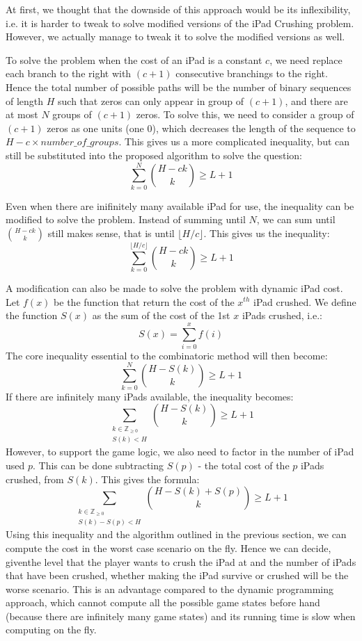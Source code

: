 \documentclass[12pt,a4paper,oneside]{report}
\begin{document}
At first, we thought that the downside of this approach would be its inflexibility, i.e. it is harder to tweak to solve modified versions of the iPad Crushing problem. However, we actually manage to tweak it to solve the modified versions as well.

To solve the problem when the cost of an iPad is a constant $c$, we need replace each branch to the right with $(c+1)$ consecutive branchings to the right. Hence the total number of possible paths will be the number of binary sequences of length $H$ such that zeros can only appear in group of $(c+1)$, and there are at most $N$ groups of $(c+1)$ zeros. To solve this, we need to consider a group of $(c+1)$ zeros as one units (one 0), which decreases the length of the sequence to $H - c \times number\_of\_groups$. This gives us a more complicated inequality, but can still be substituted into the proposed algorithm to solve the question: \[\sum_{k=0}^{N} {H-ck \choose k} \geq L+1\]

Even when there are inifinitely many available iPad for use, the inequality can be modified to solve the problem. Instead of summing until $N$, we can sum until ${H-ck \choose k}$ still makes sense, that is until $\lfloor H/c \rfloor$. This gives us the inequality: \[\sum_{k=0}^{\lfloor H/c \rfloor} {H-ck \choose k} \geq L+1\]

A modification can also be made to solve the problem with dynamic iPad cost. Let $f(x)$ be the function that return the cost of the $x^{th}$ iPad crushed. We define the function $S(x)$ as the sum of the cost of the 1st $x$ iPads crushed, i.e.: \[S(x) = \sum_{i=0}^x f(i)\] The core inequality essential to the combinatoric method will then become: \[\sum_{k=0}^N {H-S(k) \choose k} \geq L+1\] If there are infinitely many iPads available, the inequality becomes: \[\sum_{\substack{k \in \mathbb{Z}_{\geq 0}\\ S(k) < H}} {H-S(k) \choose k} \geq L+1\] However, to support the game logic, we also need to factor in the number of iPad used $p$. This can be done subtracting $S(p)$ - the total cost of the $p$ iPads crushed, from $S(k)$. This gives the formula:  \[\sum_{\substack{k \in \mathbb{Z}_{\geq 0}\\ S(k) - S(p) < H}} {H-S(k)+S(p) \choose k} \geq L+1\] Using this inequality and the algorithm outlined in the previous section, we can compute the cost in the worst case scenario on the fly. Hence we can decide, giventhe level that the player wants to crush the iPad at and the number of iPads that have been crushed, whether making the iPad survive or crushed will be the worse scenario. This is an advantage compared to the dynamic programming approach, which cannot compute all the possible game states before hand (because there are infinitely many game states) and its running time is slow when computing on the fly.
\end{document}
